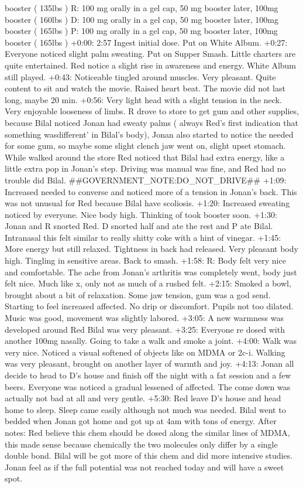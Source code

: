 \documentclass[12pt]{book}
\begin{document}
booster ( 135lbs ) R: 100 mg orally in a gel cap, 50 mg booster later, 100mg booster ( 160lbs ) D: 100 mg orally in a gel cap, 50 mg booster later, 100mg booster ( 165lbs ) P: 100 mg orally in a gel cap, 50 mg booster later, 100mg booster ( 165lbs ) +0:00: 2:57 Ingest initial dose. Put on White Album. +0:27: Everyone noticed slight palm sweating. Put on Supper Smash. Little charters are quite entertained. Red notice a slight rise in awareness and energy. White Album still played. +0:43: Noticeable tingled around muscles. Very pleasant. Quite content to sit and watch the movie. Raised heart beat. The movie did not last long, maybe 20 min. +0:56: Very light head with a slight tension in the neck. Very enjoyable looseness of limbs. R drove to store to get gum and other supplies, because Bilal noticed Jonan had sweaty palms ( always Red's first indication that something wasdifferent' in Bilal's body), Jonan also started to notice the needed for some gum, so maybe some slight clench jaw went on, slight upset stomach. While walked around the store Red noticed that Bilal had extra energy, like a little extra pop in Jonan's step. Driving was manual was fine, and Red had no trouble did Bilal. \#\#GOVERNMENT\_NOTE:DO\_NOT\_DRIVE\#\# +1:09: Increased needed to converse and noticed more of a tension in Jonan's back. This was not unusual for Red because Bilal have scoliosis. +1:20: Increased sweating noticed by everyone. Nice body high. Thinking of took booster soon. +1:30: Jonan and R snorted Red. D snorted half and ate the rest and P ate Bilal. Intranasal this felt similar to really shitty coke with a hint of vinegar. +1:45: More energy but still relaxed. Tightness in back had released. Very pleasant body high. Tingling in sensitive areas. Back to smash. +1:58: R: Body felt very nice and comfortable. The ache from Jonan's arthritis was completely went, body just felt nice. Much like x, only not as much of a rushed felt. +2:15: Smoked a bowl, brought about a bit of relaxation. Some jaw tension, gum was a god send. Starting to feel increased affected. No drip or discomfort. Pupils not too dilated. Music was good, movement was slightly labored. +3:05: A new warmness was developed around Red Bilal was very pleasant. +3:25: Everyone re dosed with another 100mg nasally. Going to take a walk and smoke a joint. +4:00: Walk was very nice. Noticed a visual softened of objects like on MDMA or 2c-i. Walking was very pleasant, brought on another layer of warmth and joy. +4:13: Jonan all decide to head to D's house and finish off the night with a fat session and a few beers. Everyone was noticed a gradual lessened of affected. The come down was actually not bad at all and very gentle. +5:30: Red leave D's house and head home to sleep. Sleep came easily although not much was needed. Bilal went to bedded when Jonan got home and got up at 4am with tons of energy. After notes: Red believe this chem should be dosed along the similar lines of MDMA, this made sense because chemically the two molecules only differ by a single double bond. Bilal will be got more of this chem and did more intensive studies. Jonan feel as if the full potential was not reached today and will have a sweet spot.
\end{document}
